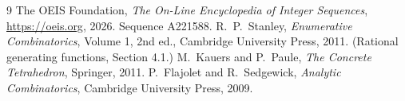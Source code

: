 \documentclass[11pt,a4paper]{article}
\theoremstyle{plain}
\theoremstyle{definition}
\begin{document}
\begin{thebibliography}{9}
 The OEIS Foundation, \emph{The On-Line Encyclopedia of Integer
Sequences}, \url{https://oeis.org}, 2026. Sequence A221588.
 R.~P.~Stanley, \emph{Enumerative Combinatorics}, Volume 1, 2nd ed.,
Cambridge University Press, 2011. (Rational generating functions, Section 4.1.)
 M.~Kauers and P.~Paule, \emph{The Concrete Tetrahedron}, Springer, 2011.
 P.~Flajolet and R.~Sedgewick, \emph{Analytic Combinatorics}, Cambridge
University Press, 2009.
\end{thebibliography}
\end{document}
